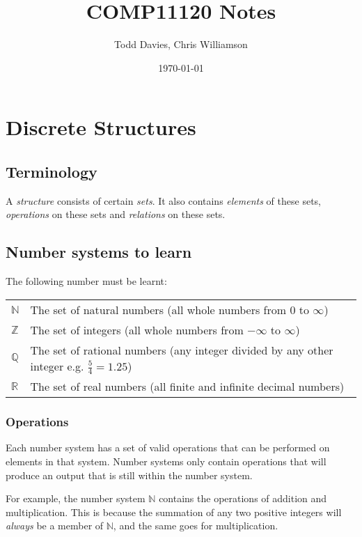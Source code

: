 \documentclass{article}
\author{Todd Davies, Chris Williamson}
\title{COMP11120 Notes}
\date{\today}
\begin{document}
\lhead{\today}

\maketitle

\section{Discrete Structures}

\subsection{Terminology}

A {\it structure} consists of certain {\it sets}. It also contains {\it elements} of these sets, {\it operations} on these sets and {\it relations} on these sets.

\subsection{Number systems to learn}

The following number must be learnt:

\begin{tabularx}{\textwidth}{l X}
	$\mathbb{N}$ & The set of natural numbers (all whole numbers from $0$ to $\infty$)\\

	$\mathbb{Z}$ & The set of integers (all whole numbers from $-\infty$ to $\infty$)\\

	$\mathbb{Q}$ & The set of rational numbers (any integer divided by any other integer e.g. $\frac{5}{4}=1.25$)\\

	$\mathbb{R}$ & The set of real numbers (all finite and infinite decimal numbers)\\
\end{tabularx}

\subsubsection{Operations}

Each number system has a set of valid operations that can be performed on elements in that system. Number systems only contain operations that will produce an output that is still within the number system.

For example, the number system $\mathbb{N}$ contains the operations of addition and multiplication. This is because the summation of any two positive integers will {\it always} be a member of $\mathbb{N}$, and the same goes for multiplication.
\end{document}
